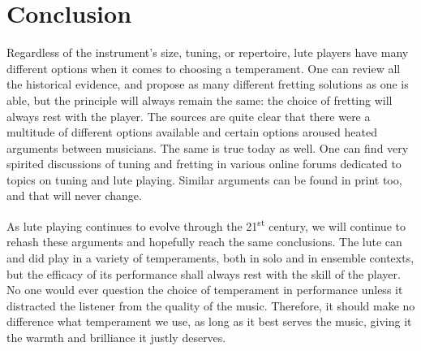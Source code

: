 \section{Conclusion}

Regardless of the instrument's size, tuning, or repertoire, lute players have many
different options when it comes to choosing a temperament.  One can review all the
historical evidence, and propose as many different fretting solutions as one is able,
but the principle will always remain the same: the choice of fretting will always rest
with the player. The sources are quite clear that there were a multitude of different
options available and certain options aroused heated arguments between musicians. The
same is true today as well. One can find very spirited discussions of tuning and
fretting in various online forums dedicated to topics on tuning and lute playing.
Similar arguments can be found in print too, and that will never change. \autocite{DD:4}

As lute playing continues to evolve through the 21\textsuperscript{st} century, we will continue to
rehash these arguments and hopefully reach the same conclusions. The lute can and did play in a
variety of temperaments, both in solo and in ensemble contexts, but the efficacy of its performance
shall always rest with the skill of the player. No one would ever question the choice of temperament
in performance unless it distracted the listener from the quality of the music.  Therefore, it
should make no difference what temperament we use, as long as it best serves the music, giving it
the warmth and brilliance it justly deserves.

